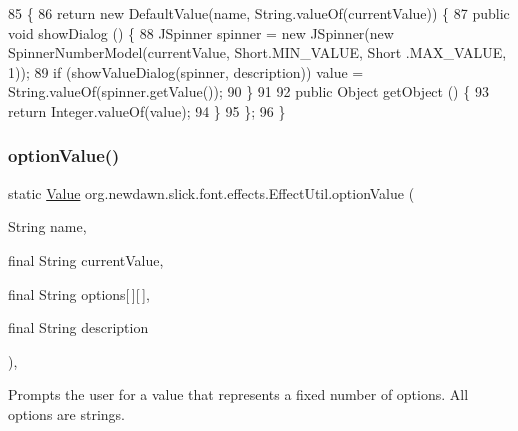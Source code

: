 \begin{DoxyCode}
85                                                                                                  \{
86         \textcolor{keywordflow}{return} \textcolor{keyword}{new} DefaultValue(name, String.valueOf(currentValue)) \{
87             \textcolor{keyword}{public} \textcolor{keywordtype}{void} showDialog () \{
88                 JSpinner spinner = \textcolor{keyword}{new} JSpinner(\textcolor{keyword}{new} SpinnerNumberModel(currentValue, Short.MIN\_VALUE, Short
      .MAX\_VALUE, 1));
89                 \textcolor{keywordflow}{if} (showValueDialog(spinner, description)) value = String.valueOf(spinner.getValue());
90             \}
91 
92             \textcolor{keyword}{public} Object getObject () \{
93                 \textcolor{keywordflow}{return} Integer.valueOf(value);
94             \}
95         \};
96     \}
\end{DoxyCode}
\mbox{\label{classorg_1_1newdawn_1_1slick_1_1font_1_1effects_1_1_effect_util_a5e01a6d3ca0dfca854a24b9cacb264a0}} 
\subsubsection{\texorpdfstring{option\+Value()}{optionValue()}}
{\footnotesize\ttfamily static \mbox{\hyperlink{interfaceorg_1_1newdawn_1_1slick_1_1font_1_1effects_1_1_configurable_effect_1_1_value}{Value}} org.\+newdawn.\+slick.\+font.\+effects.\+Effect\+Util.\+option\+Value (\begin{DoxyParamCaption}\item[{String}]{name,  }\item[{final String}]{current\+Value,  }\item[{final String}]{options\mbox{[}$\,$\mbox{]}\mbox{[}$\,$\mbox{]},  }\item[{final String}]{description }\end{DoxyParamCaption})\hspace{0.3cm}{\ttfamily [inline]}, {\ttfamily [static]}}

Prompts the user for a value that represents a fixed number of options. All options are strings.


